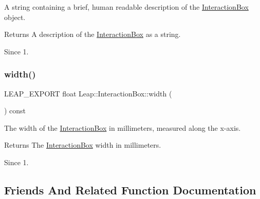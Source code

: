 A string containing a brief, human readable description of the \hyperlink{class_leap_1_1_interaction_box}{Interaction\+Box} object.

\begin{DoxyReturn}{Returns}
A description of the \hyperlink{class_leap_1_1_interaction_box}{Interaction\+Box} as a string. 
\end{DoxyReturn}
\begin{DoxySince}{Since}
1. 
\end{DoxySince}
\mbox{\label{class_leap_1_1_interaction_box_a6aa65d89337305360c0de6b583cf15a0}} 
\subsubsection{\texorpdfstring{width()}{width()}}
{\footnotesize\ttfamily L\+E\+A\+P\+\_\+\+E\+X\+P\+O\+RT float Leap\+::\+Interaction\+Box\+::width (\begin{DoxyParamCaption}{ }\end{DoxyParamCaption}) const}

The width of the \hyperlink{class_leap_1_1_interaction_box}{Interaction\+Box} in millimeters, measured along the x-\/axis.


\begin{DoxyCodeInclude}
\end{DoxyCodeInclude}


\begin{DoxyReturn}{Returns}
The \hyperlink{class_leap_1_1_interaction_box}{Interaction\+Box} width in millimeters. 
\end{DoxyReturn}
\begin{DoxySince}{Since}
1. 
\end{DoxySince}


\subsection{Friends And Related Function Documentation}
\mbox{\label{class_leap_1_1_interaction_box_a35cb230346cbaebc7c2a7dca7917c89e}} 
